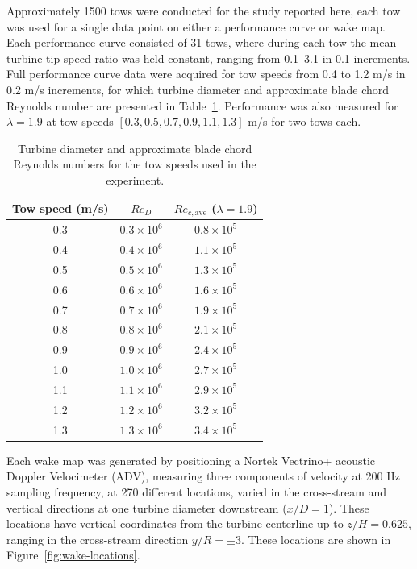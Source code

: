\documentclass[energies,article,accept,moreauthors,pdftex,12pt,a4paper]{mdpi}
\begin{document}
Approximately 1500 tows were conducted for the study reported here, each tow was
used for a single data point on either a performance curve or wake map. Each
performance curve consisted of 31 tows, where during each tow the mean turbine
tip speed ratio was held constant, ranging from 0.1--3.1 in 0.1 increments. Full
performance curve data were acquired for tow speeds from 0.4 to 1.2 m/s in 0.2
m/s increments, for which turbine diameter and approximate blade chord Reynolds
number are presented in Table~\ref{tab:Re}. Performance was also measured for
$\lambda=1.9$ at tow speeds $[0.3, 0.5, 0.7, 0.9, 1.1, 1.3]$ m/s for two tows
each.

\begin{table}
\centering
\begin{tabular}{ccc}
Tow speed (m/s) & $Re_D$ & $Re_{c,\mathrm{ave}}$ ($\lambda = 1.9$) \\
\hline
0.3 & $0.3 \times 10^6$ & $0.8 \times 10^5$ \\
0.4 & $0.4 \times 10^6$ & $1.1 \times 10^5$ \\
0.5 & $0.5 \times 10^6$ & $1.3 \times 10^5$ \\
0.6 & $0.6 \times 10^6$ & $1.6 \times 10^5$ \\
0.7 & $0.7 \times 10^6$ & $1.9 \times 10^5$ \\
0.8 & $0.8 \times 10^6$ & $2.1 \times 10^5$ \\
0.9 & $0.9 \times 10^6$ & $2.4 \times 10^5$ \\
1.0 & $1.0 \times 10^6$ & $2.7 \times 10^5$ \\
1.1 & $1.1 \times 10^6$ & $2.9 \times 10^5$ \\
1.2 & $1.2 \times 10^6$ & $3.2 \times 10^5$ \\
1.3 & $1.3 \times 10^6$ & $3.4 \times 10^5$ \\
\end{tabular}
\caption{Turbine diameter and approximate blade chord Reynolds numbers for the
tow speeds used in the experiment.}
\label{tab:Re}
\end{table}

Each wake map was generated by positioning a Nortek Vectrino+ acoustic Doppler
Velocimeter (ADV), measuring three components of velocity at 200 Hz sampling
frequency, at 270 different locations, varied in the cross-stream and vertical
directions at one turbine diameter downstream ($x/D=1$). These locations have
vertical coordinates from the turbine centerline up to $z/H=0.625$, ranging in
the cross-stream direction $y/R = \pm 3$. These locations are shown in
Figure~\ref{fig:wake-locations}.
\end{document}
